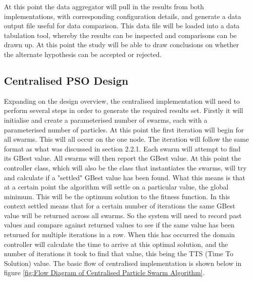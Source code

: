 \documentclass[oneside,12pt]{book}
\begin{document}
At this point the data aggregator will pull in the results from both implementations, with corresponding configuration details, and generate a data output file useful for data comparison. This data file will be loaded into a data tabulation tool, whereby the results can be inspected and comparisons can be drawn up. At this point the study will be able to draw conclusions on whether the alternate hypothesis can be accepted or rejected.  

\subsection{Centralised PSO Design}
Expanding on the design overview, the centralised implementation will need to perform several steps in order to generate the required results set. Firstly it will initialise and create a parameterised number of swarms, each with a parameterised number of particles. At this point the first iteration will begin for all swarms. This will all occur on the one node. The iteration will follow the same format as what was discussed in section 2.2.1. Each swarm will attempt to find its GBest value. All swarms will then report the GBest value. At this point the controller class, which will also be the class that instantiates the swarms, will try and calculate if a "settled" GBest value has been found. What this means is that at a certain point the algorithm will settle on a particular value, the global minimum. This will be the optimum solution to the fitness function. In this context settled means that for a certain number of iterations the same GBest value will be returned across all swarms. So the system will need to record past values and compare against returned values to see if the same value has been returned for multiple iterations in a row. When this has occurred the domain controller will calculate the time to arrive at this optimal solution, and the number of iterations it took to find that value, this being the TTS (Time To Solution) value. 
The basic flow of centralised implementation is shown below in figure \ref{fig:Flow Diagram of Centralised Particle Swarm Algorithm}. 
\end{document}
